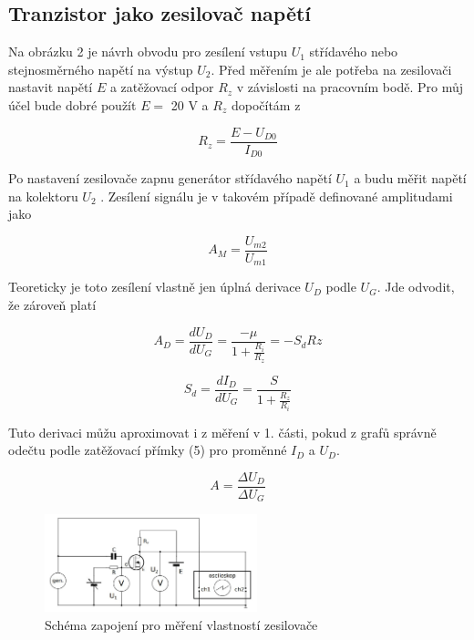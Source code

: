 \documentclass[a4paper,11pt]{article}
\begin{document}
\subsection{Tranzistor jako zesilovač napětí}

Na obrázku 2 je návrh obvodu pro zesílení vstupu $ U_1 $ střídavého nebo stejnosměrného napětí na výstup $ U_2 $. Před měřením je ale potřeba na zesilovači nastavit napětí $ E $ a zatěžovací odpor $ R_z $ v závislosti na pracovním bodě. Pro můj účel bude dobré použít $ E =  $ 20 V a $ R_z $ dopočítám z

\begin{equation}
 R_z = \frac{E - U_{D0}}{I_{D0}}
\end{equation}

Po nastavení zesilovače zapnu generátor střídavého napětí $ U_{1} $ a budu měřit napětí na kolektoru $ U_{2} $ . Zesílení signálu je v takovém případě definované amplitudami jako

\begin{equation}
    A_M = \frac{U_{m2}}{U_{m1}}
\end{equation}

Teoreticky je toto zesílení vlastně jen úplná derivace $ U_D $ podle $ U_G $. Jde odvodit, že zároveň platí

\begin{equation}
A_D = \frac{d U_D}{d U_G} = \frac{-\mu}{1 + \frac{R_i}{R_z}} = -S_d Rz 
\end{equation}

\begin{equation}
S_d = \frac{dI_D}{dU_G} = \frac{S}{1 + \frac{R_z}{R_i}}
\end{equation}

Tuto derivaci můžu aproximovat i z měření v 1. části, pokud z grafů správně odečtu podle zatěžovací přímky (5) pro proměnné $ I_D $ a $ U_D $.

\begin{equation}
A = \frac{\Delta U_D}{\Delta U_G}
\end{equation}

\begin{figure}[htpb]
    \centering
    \includegraphics[width=0.55\textwidth]{zesilovac.jpg}
    \caption{Schéma zapojení pro měření vlastností zesilovače}
\end{figure}
\end{document}
